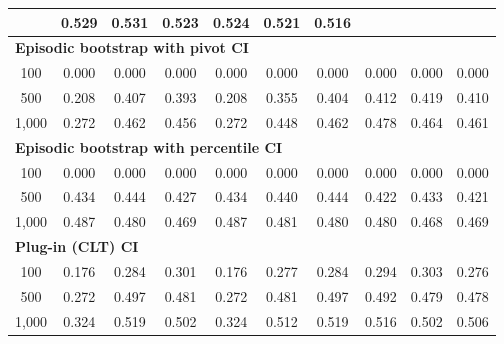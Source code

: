 \documentclass{article}
\numberwithin{equation}{section}
\begin{document}
\begin{table}[ht]
\begin{tabular}{c|ccc|cccccc}
& \cellcolor{covheat!100!white}0.529 & \cellcolor{covheat!100!white}0.531 & \cellcolor{covheat!100!white}0.523 & \cellcolor{covheat!100!white}0.524 & \cellcolor{covheat!100!white}0.521 & \cellcolor{covheat!100!white}0.516 \\
\hline
\multicolumn{10}{l}{\textbf{Episodic bootstrap with pivot CI}} \\ \hline
100
& 0.000 & 0.000 & 0.000
& 0.000 & 0.000 & 0.000 & 0.000 & 0.000 & 0.000 \\
500
& 0.208 & \cellcolor{covheat!53!white}0.407 & \cellcolor{covheat!47!white}0.393
& 0.208 & \cellcolor{covheat!27!white}0.355 & \cellcolor{covheat!52!white}0.404 & \cellcolor{covheat!56!white}0.412 & \cellcolor{covheat!60!white}0.419 & \cellcolor{covheat!55!white}0.410 \\
1{,}000
& 0.272 & \cellcolor{covheat!81!white}0.462 & \cellcolor{covheat!78!white}0.456
& 0.272 & \cellcolor{covheat!74!white}0.448 & \cellcolor{covheat!81!white}0.462 & \cellcolor{covheat!89!white}0.478 & \cellcolor{covheat!82!white}0.464 & \cellcolor{covheat!81!white}0.461 \\
\hline
\multicolumn{10}{l}{\textbf{Episodic bootstrap with percentile CI}} \\ \hline
100
& 0.000 & 0.000 & 0.000
& 0.000 & 0.000 & 0.000 & 0.000 & 0.000 & 0.000 \\
500
& \cellcolor{covheat!67!white}0.434 & \cellcolor{covheat!72!white}0.444 & \cellcolor{covheat!64!white}0.427
& \cellcolor{covheat!67!white}0.434 & \cellcolor{covheat!70!white}0.440 & \cellcolor{covheat!72!white}0.444 & \cellcolor{covheat!61!white}0.422 & \cellcolor{covheat!66!white}0.433 & \cellcolor{covheat!60!white}0.421 \\
1{,}000
& \cellcolor{covheat!94!white}0.487 & \cellcolor{covheat!90!white}0.480 & \cellcolor{covheat!84!white}0.469
& \cellcolor{covheat!94!white}0.487 & \cellcolor{covheat!90!white}0.481 & \cellcolor{covheat!90!white}0.480 & \cellcolor{covheat!90!white}0.480 & \cellcolor{covheat!84!white}0.468 & \cellcolor{covheat!84!white}0.469 \\
\hline
\multicolumn{10}{l}{\textbf{Plug-in (CLT) CI}} \\ \hline
100
& 0.176 & 0.284 & \cellcolor{covheat!1!white}0.301
& 0.176 & 0.277 & 0.284 & 0.294 & \cellcolor{covheat!2!white}0.303 & 0.276 \\
500
& 0.272 & \cellcolor{covheat!98!white}0.497 & \cellcolor{covheat!90!white}0.481
& 0.272 & \cellcolor{covheat!90!white}0.481 & \cellcolor{covheat!98!white}0.497 & \cellcolor{covheat!96!white}0.492 & \cellcolor{covheat!89!white}0.479 & \cellcolor{covheat!89!white}0.478 \\
1{,}000
& \cellcolor{covheat!12!white}0.324 & \cellcolor{covheat!100!white}0.519 & \cellcolor{covheat!100!white}0.502
& \cellcolor{covheat!12!white}0.324 & \cellcolor{covheat!100!white}0.512 & \cellcolor{covheat!100!white}0.519 & \cellcolor{covheat!100!white}0.516 & \cellcolor{covheat!100!white}0.502 & \cellcolor{covheat!100!white}0.506 \\
\hline
\end{tabular}
\end{table}
\end{document}
